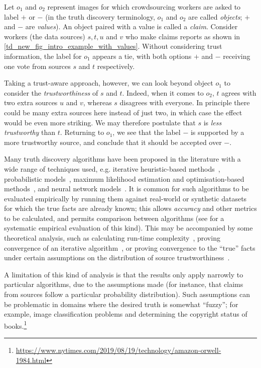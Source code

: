 \begin{example}
\label{td_new_ex_intro_example}
    Let $o_1$ and $o_2$ represent images for which crowdsourcing workers are
    asked to label $+$ or $-$ (in the truth discovery terminology, $o_1$ and
    $o_2$ are called \emph{objects}; $+$ and $-$ are \emph{values}). An object
    paired with a value is called a \emph{claim}.
    Consider workers (the data sources) $s, t, u$ and $v$ who make claims
    reports as shown in \cref{td_new_fig_intro_example_with_values}. Without
    considering trust information, the label for $o_1$ appears a tie, with both
    options $+$ and $-$ receiving one vote from sources $s$ and $t$
    respectively.

    Taking a trust-aware approach, however, we can look beyond object $o_1$ to
    consider the \emph{trustworthiness} of $s$ and $t$. Indeed, when it comes
    to $o_2$, $t$ agrees with two extra sources $u$ and $v$, whereas $s$
    disagrees with everyone. In principle there could be many extra sources
    here instead of just two, in which case the effect would be even more
    striking. We may therefore postulate that $s$ is \emph{less trustworthy}
    than $t$. Returning to $o_1$, we see that the label $-$ is supported by a
    more trustworthy source, and conclude that it should be accepted over $-$.
\end{example}

Many truth discovery algorithms have been proposed in the literature with a
wide range of techniques used, e.g. iterative heuristic-based
methods~\cite{pasternack2010,galland2010}, probabilistic models~\cite{yin2008},
maximum likelihood estimation and optimisation-based methods~\cite{li2016}, and
neural network
models~\cite{kotonya2020explainable,marshall2017neural,wang2018eann}. It is
common for such algorithms to be evaluated empirically by running them against
real-world or synthetic datasets for which the true facts are already known;
this allows \emph{accuracy} and other metrics to be calculated, and permits
comparison between algorithms (see \cite{waguih2014truth} for a systematic
empirical evaluation of this kind). This may be accompanied by some theoretical
analysis, such as calculating run-time complexity~\cite{gupta2011survey},
proving convergence of an iterative algorithm~\cite{yin_supervised_2011}, or
proving convergence to the ``true'' facts under certain assumptions on the
distribution of source
trustworthiness~\cite{xiao2016,xiao_thesis2018,ghosh_2011}.

A limitation of this kind of analysis is that the results only apply narrowly
to particular algorithms, due to the assumptions made (for instance, that
claims from sources follow a particular probability distribution). Such
assumptions can be problematic in domains where the desired truth is somewhat
``fuzzy''; for example, image classification problems and determining the
copyright status of
books.\footnote{\url{https://www.nytimes.com/2019/08/19/technology/amazon-orwell-1984.html}}

